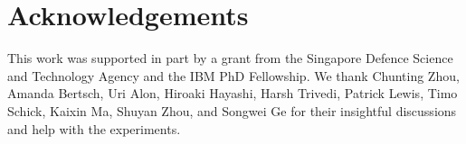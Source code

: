 \section*{Acknowledgements}
This work was supported in part by a grant from the Singapore Defence Science and Technology Agency and the IBM PhD Fellowship.
We thank Chunting Zhou, Amanda Bertsch, Uri Alon, Hiroaki Hayashi, Harsh Trivedi, Patrick Lewis, Timo Schick, Kaixin Ma, Shuyan Zhou, and Songwei Ge for their insightful discussions and help with the experiments.

\newpage

\newpage

